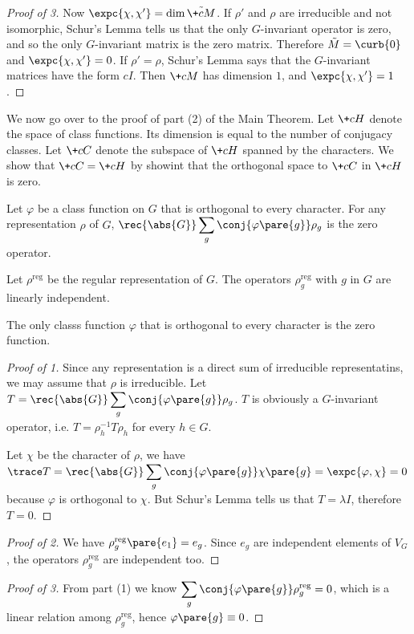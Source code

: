 \documentclass[hidelinks]{article}
\begin{document}
\begin{proof}[Proof of 3]
    Now $\expc{\chi,\chi'} = \dim \tilde{\+cM}$. If $\rho'$ and $\rho$ are irreducible and not isomorphic, Schur's Lemma tells us that the only $G$-invariant operator is zero, and so the only $G$-invariant matrix is the zero matrix. Therefore $\tilde{M} = \curb{0}$ and $\expc{\chi,\chi'} = 0$. If $\rho' = \rho$, Schur's Lemma says that the $G$-invariant matrices have the form $cI$. Then $\+cM$ has dimension $1$, and $\expc{\chi,\chi'} = 1$.
\end{proof}
We now go over to the proof of part (2) of the Main Theorem. Let $\+cH$ denote the space of class functions. Its dimension is equal to the number of conjugacy classes. Let $\+cC$ denote the subspace of $\+cH$ spanned by the characters. We show that $\+cC = \+cH$ by showint that the orthogonal space to $\+cC$ in $\+cH$ is zero.
\begin{lemma}
    \mbox{}
    \begin{cenum}
        \item Let $\varphi$ be a class function on $G$ that is orthogonal to every character. For any representation $\rho$ of $G$, $\displaystyle \rec{\abs{G}}\sum_g \conj{\varphi\pare{g}}\rho_g$ is the zero operator.
        \item Let $\rho^{\mathrm{reg}}$ be the regular representation of $G$. The operators $\rho_g^{\mathrm{reg}}$ with $g$ in $G$ are linearly independent.
        \item The only classs function $\varphi$ that is orthogonal to every character is the zero function.
    \end{cenum}
\end{lemma}
\begin{proof}[Proof of 1]
    Since any representation is a direct sum of irreducible representatins, we may assume that $\rho$ is irreducible. Let $\displaystyle T = \rec{\abs{G}}\sum_g \conj{\varphi\pare{g}}\rho_g$. $T$ is obviously a $G$-invariant operator, i.e. $T = \rho_h^{-1}T\rho_h$ for every $h\in G$.
    \par
    Let $\chi$ be the character of $\rho$, we have $\displaystyle \trace T = \rec{\abs{G}}\sum_g \conj{\varphi\pare{g}}\chi\pare{g} = \expc{\varphi,\chi} = 0$ because $\varphi$ is orthogonal to $\chi$. But Schur's Lemma tells us that $T = \lambda I$, therefore $T=0$.
\end{proof}
\begin{proof}[Proof of 2]
    We have $\rho_g^{\mathrm{reg}}\pare{e_1} = e_g$. Since $e_g$ are independent elements of $V_G$, the operators $\rho_g^{\mathrm{reg}}$ are independent too.
\end{proof}
\begin{proof}[Proof of 3]
    From part (1) we know $\displaystyle \sum_g \conj{\varphi\pare{g}}\rho_g^{\mathrm{reg}} = 0$, which is a linear relation among $\rho_g^{\mathrm{reg}}$, hence $\varphi\pare{g} \equiv 0$.
\end{proof}
\end{document}
